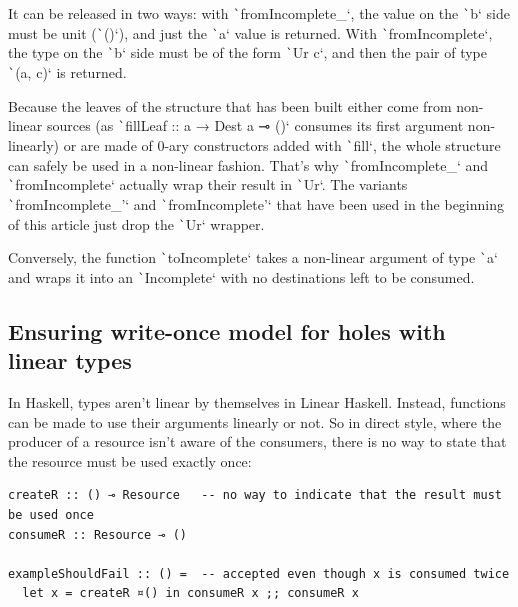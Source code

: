 \documentclass[english]{jflart}
\newlength{\currentparskip}
\newenvironment{unbreakable}
{%
  \setlength{\currentparskip}{\parskip}%
  \setlength{\parskip}{\currentparskip}%
  \par\vspace{0.5\baselineskip}%
  \noindent\begin{minipage}{\textwidth}%
    \setlength{\parskip}{\currentparskip}%
}
{%
  \end{minipage}%
  \par\vspace{0.5\baselineskip}%
}
\begin{document}
It can be released in two ways: with \texttt`fromIncomplete_`, the value on the \texttt`b` side must be unit (\texttt`()`), and just the \texttt`a` value is returned. With \texttt`fromIncomplete`, the type on the \texttt`b` side must be of the form \texttt`Ur c`, and then the pair of type \texttt`(a, c)` is returned.

Because the leaves of the structure that has been built either come from non-linear sources (as \texttt`fillLeaf :: a → Dest a ⊸ ()` consumes its first argument non-linearly) or are made of 0-ary constructors added with \texttt`fill`, the whole structure can safely be used in a non-linear fashion. That's why \texttt`fromIncomplete_` and \texttt`fromIncomplete` actually wrap their result in \texttt`Ur`. The variants \texttt`fromIncomplete_'` and \texttt`fromIncomplete'` that have been used in the beginning of this article just drop the \texttt`Ur` wrapper.

Conversely, the function \texttt`toIncomplete` takes a non-linear argument of type \texttt`a` and wraps it into an \texttt`Incomplete` with no destinations left to be consumed.

\subsection{Ensuring write-once model for holes with linear types}\label{ssec:api-linearity}

In Haskell, types aren't linear by themselves in Linear Haskell. Instead, functions can be made to use their arguments linearly or not. So in direct style, where the producer of a resource isn't aware of the consumers, there is no way to state that the resource must be used exactly once:

\begin{unbreakable}
{\small
\begin{verbatim}
createR :: () ⊸ Resource   -- no way to indicate that the result must be used once
consumeR :: Resource ⊸ ()

exampleShouldFail :: () =  -- accepted even though x is consumed twice
  let x = createR ¤() in consumeR x ;; consumeR x
\end{verbatim}
}
\end{unbreakable}
\end{document}
